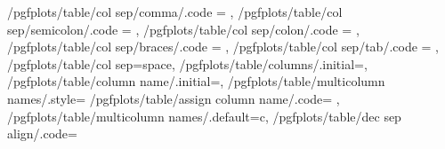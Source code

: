{	/pgfplots/table/col sep/comma/.code		= {\def\pgfplotstableread@COLSEP@CASE{1}},
	/pgfplots/table/col sep/semicolon/.code	= {\def\pgfplotstableread@COLSEP@CASE{2}},
	/pgfplots/table/col sep/colon/.code		= {\def\pgfplotstableread@COLSEP@CASE{3}},
	/pgfplots/table/col sep/braces/.code	= {\def\pgfplotstableread@COLSEP@CASE{4}},
	/pgfplots/table/col sep/tab/.code	= {\def\pgfplotstableread@COLSEP@CASE{5}},
	/pgfplots/table/col sep=space,
	/pgfplots/table/columns/.initial=,
	/pgfplots/table/column name/.initial=\pgfkeysnovalue,
	/pgfplots/table/multicolumn names/.style={%
		/pgfplots/table/assign column name/.code={%
		}%
	},
	/pgfplots/table/multicolumn names/.default=c,
	/pgfplots/table/dec sep align/.code={%
		\def\pgfplotstable@scisepalign@headeralign{#1}%
		}}
